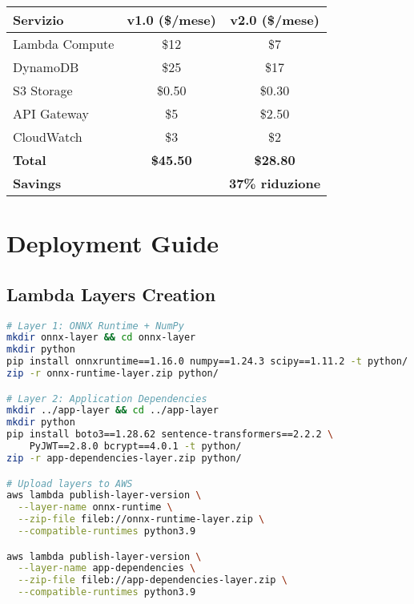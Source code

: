 \documentclass[11pt,a4paper]{article}
\begin{document}
\begin{center}
\begin{tabular}{lcc}
\toprule
\textbf{Servizio} & \textbf{v1.0 (\$/mese)} & \textbf{v2.0 (\$/mese)} \\
\midrule
Lambda Compute & \$12 & \$7 \\
DynamoDB & \$25 & \$17 \\
S3 Storage & \$0.50 & \$0.30 \\
API Gateway & \$5 & \$2.50 \\
CloudWatch & \$3 & \$2 \\
\midrule
\textbf{Total} & \textbf{\$45.50} & \textbf{\$28.80} \\
\textbf{Savings} & & \textbf{37\% riduzione} \\
\bottomrule
\end{tabular}
\end{center}

\section{Deployment Guide}

\subsection{Lambda Layers Creation}
\begin{lstlisting}[language=bash, caption=Script Creazione Lambda Layers]
# Layer 1: ONNX Runtime + NumPy
mkdir onnx-layer && cd onnx-layer
mkdir python
pip install onnxruntime==1.16.0 numpy==1.24.3 scipy==1.11.2 -t python/
zip -r onnx-runtime-layer.zip python/

# Layer 2: Application Dependencies  
mkdir ../app-layer && cd ../app-layer
mkdir python
pip install boto3==1.28.62 sentence-transformers==2.2.2 \
    PyJWT==2.8.0 bcrypt==4.0.1 -t python/
zip -r app-dependencies-layer.zip python/

# Upload layers to AWS
aws lambda publish-layer-version \
  --layer-name onnx-runtime \
  --zip-file fileb://onnx-runtime-layer.zip \
  --compatible-runtimes python3.9

aws lambda publish-layer-version \
  --layer-name app-dependencies \
  --zip-file fileb://app-dependencies-layer.zip \
  --compatible-runtimes python3.9
\end{lstlisting}
\end{document}
